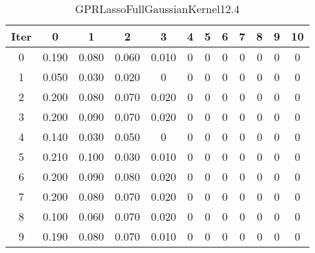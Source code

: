 \begin{table}
	\begin{center}
		\begin{tabular}{|c|c|c|c|c|c|c|c|c|c|c|c|}
			\hline
			Iter & 0 & 1 & 2 & 3 & 4 & 5 & 6 & 7 & 8 & 9 & 10 \\
			\hline
			0 & 0.190 & 0.080 & 0.060 & 0.010 & 0 & 0 & 0 & 0 & 0 & 0 & 0 \\
			\hline
			1 & 0.050 & 0.030 & 0.020 & 0 & 0 & 0 & 0 & 0 & 0 & 0 & 0 \\
			\hline
			2 & 0.200 & 0.080 & 0.070 & 0.020 & 0 & 0 & 0 & 0 & 0 & 0 & 0 \\
			\hline
			3 & 0.200 & 0.090 & 0.070 & 0.020 & 0 & 0 & 0 & 0 & 0 & 0 & 0 \\
			\hline
			4 & 0.140 & 0.030 & 0.050 & 0 & 0 & 0 & 0 & 0 & 0 & 0 & 0 \\
			\hline
			5 & 0.210 & 0.100 & 0.030 & 0.010 & 0 & 0 & 0 & 0 & 0 & 0 & 0 \\
			\hline
			6 & 0.200 & 0.090 & 0.080 & 0.020 & 0 & 0 & 0 & 0 & 0 & 0 & 0 \\
			\hline
			7 & 0.200 & 0.080 & 0.070 & 0.020 & 0 & 0 & 0 & 0 & 0 & 0 & 0 \\
			\hline
			8 & 0.100 & 0.060 & 0.070 & 0.020 & 0 & 0 & 0 & 0 & 0 & 0 & 0 \\
			\hline
			9 & 0.190 & 0.080 & 0.070 & 0.010 & 0 & 0 & 0 & 0 & 0 & 0 & 0 \\
			\hline
		\end{tabular}
	\end{center}
	\caption{GPRLassoFullGaussianKernel12.4}
\end{table}